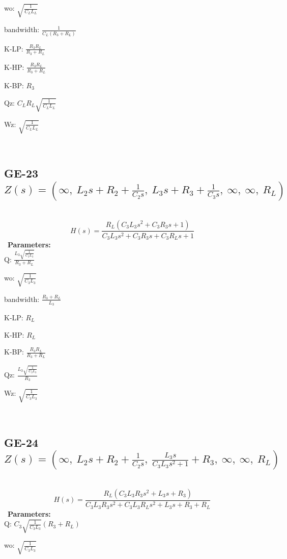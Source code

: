 \documentclass{article}
\begin{document}
wo: $\sqrt{\frac{1}{C_{L} L_{L}}}$\ 

bandwidth: $\frac{1}{C_{L} \left(R_{3} + R_{L}\right)}$\ 

K-LP: $\frac{R_{3} R_{L}}{R_{3} + R_{L}}$\ 

K-HP: $\frac{R_{3} R_{L}}{R_{3} + R_{L}}$\ 

K-BP: $R_{3}$\ 

Qz: $C_{L} R_{L} \sqrt{\frac{1}{C_{L} L_{L}}}$\ 

Wz: $\sqrt{\frac{1}{C_{L} L_{L}}}$\ 

\ 

\subsection{GE-23 $Z(s) = \left( \infty, \  L_{2} s + R_{2} + \frac{1}{C_{2} s}, \  L_{3} s + R_{3} + \frac{1}{C_{3} s}, \  \infty, \  \infty, \  R_{L}\right)$ } \ 
\textbf{\[H(s) = \frac{R_{L} \left(C_{3} L_{3} s^{2} + C_{3} R_{3} s + 1\right)}{C_{3} L_{3} s^{2} + C_{3} R_{3} s + C_{3} R_{L} s + 1}\] } \ 
\textbf{Parameters:}\\ 

Q: $\frac{L_{3} \sqrt{\frac{1}{C_{3} L_{3}}}}{R_{3} + R_{L}}$\ 

wo: $\sqrt{\frac{1}{C_{3} L_{3}}}$\ 

bandwidth: $\frac{R_{3} + R_{L}}{L_{3}}$\ 

K-LP: $R_{L}$\ 

K-HP: $R_{L}$\ 

K-BP: $\frac{R_{3} R_{L}}{R_{3} + R_{L}}$\ 

Qz: $\frac{L_{3} \sqrt{\frac{1}{C_{3} L_{3}}}}{R_{3}}$\ 

Wz: $\sqrt{\frac{1}{C_{3} L_{3}}}$\ 

\ 

\subsection{GE-24 $Z(s) = \left( \infty, \  L_{2} s + R_{2} + \frac{1}{C_{2} s}, \  \frac{L_{3} s}{C_{3} L_{3} s^{2} + 1} + R_{3}, \  \infty, \  \infty, \  R_{L}\right)$ } \ 
\textbf{\[H(s) = \frac{R_{L} \left(C_{3} L_{3} R_{3} s^{2} + L_{3} s + R_{3}\right)}{C_{3} L_{3} R_{3} s^{2} + C_{3} L_{3} R_{L} s^{2} + L_{3} s + R_{3} + R_{L}}\] } \ 
\textbf{Parameters:}\\ 

Q: $C_{3} \sqrt{\frac{1}{C_{3} L_{3}}} \left(R_{3} + R_{L}\right)$\ 

wo: $\sqrt{\frac{1}{C_{3} L_{3}}}$\ 
\end{document}
